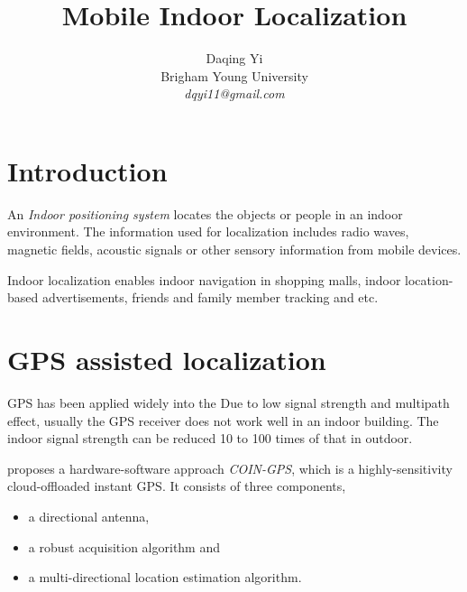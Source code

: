 \documentclass[letterpaper]{article}
\begin{document}
%
\title{Mobile Indoor Localization}

\author{Daqing Yi\\
Brigham Young University \\
\emph{dqyi11@gmail.com}
}
\maketitle

\section{Introduction}

An \emph{Indoor positioning system} locates the objects or people in an indoor environment.
The information used for localization includes radio waves, magnetic fields, acoustic signals or other sensory information from mobile devices.

Indoor localization enables indoor navigation in shopping malls, indoor location-based advertisements, friends and family member tracking and etc.

\section{GPS assisted localization}
\label{sec:gps_local}

GPS has been applied widely into the 
Due to low signal strength and multipath effect, usually the GPS receiver does not work well in an indoor building.
The indoor signal strength can be reduced 10 to 100 times of that in outdoor.

\cite{Nirjon:2014:CIL:2594368.2594378} proposes a hardware-software approach \emph{COIN-GPS}, which is a highly-sensitivity cloud-offloaded instant GPS.
It consists of three components,
\begin{itemize}
	\item a directional antenna,
	\item a robust acquisition algorithm and
	\item a multi-directional location estimation algorithm.
\end{itemize}
\end{document}
